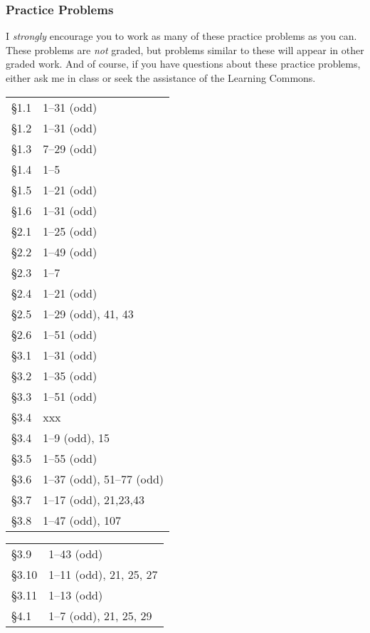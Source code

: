 \documentclass[12pt]{article}
\begin{document}
\subsubsection*{Practice Problems}

I \emph{strongly} encourage you to work as many of these practice problems as you can. These problems
are \emph{not} graded, but problems similar to these will appear in other graded work.
And of course, if you have questions about these practice problems, either ask me 
in class or seek the assistance of the Learning Commons.

\begin{center}
\begin{minipage}{8.5in}
\begin{tabular}{|l | l |} \hline
  \S1.1 & 1--31 (odd) \\
  \S1.2 & 1--31 (odd) \\
  \S1.3 & 7--29 (odd) \\
  \S1.4 & 1--5  \\
  \S1.5 & 1--21 (odd) \\
  \S1.6 & 1--31 (odd) \\
  \S2.1 & 1--25 (odd) \\
  \S2.2 & 1--49 (odd)  \\ 
  \S2.3 & 1--7 \\
  \S2.4 & 1--21 (odd) \\ 
  \S2.5 & 1--29 (odd), 41, 43 \\ 
  \S2.6 & 1--51 (odd) \\ 
  \S3.1 & 1--31 (odd) \\
  \S3.2 & 1--35 (odd) \\
  \S3.3 & 1--51 (odd) \\
  \S3.4 &  xxx  \\
  \S3.4 & 1--9 (odd), 15 \\
  \S3.5 & 1--55 (odd)    \\
  \S3.6 & 1--37 (odd), 51--77 (odd) \\
  \S3.7 & 1--17 (odd), 21,23,43 \\
  \S3.8  & 1--47 (odd), 107 \\ \hline
\end{tabular}
\hspace{0.25in}
\begin{tabular}{|l | l |} \hline
  \S3.9 & 1--43 (odd) \\
  \S3.10 & 1--11 (odd), 21, 25, 27 \\
  \S3.11 & 1--13 (odd) \\
  \S4.1 & 1--7 (odd), 21, 25, 29  \\

\end{tabular}
\end{minipage}
\end{center}
\end{document}
